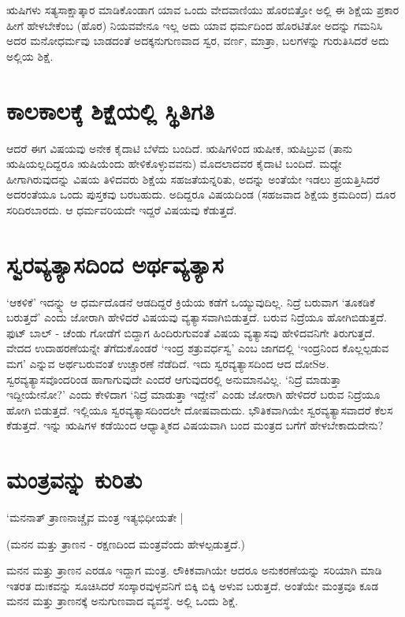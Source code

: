  ಋಷಿಗಳು ಸತ್ಯಸಾಕ್ಷಾತ್ಕಾರ ಮಾಡಿಕೊಂಡಾಗ ಯಾವ ಒಂದು ವೇದವಾಣಿಯು ಹೊರಬಿತ್ತೋ ಅಲ್ಲಿ ಈ ಶಿಕ್ಷೆಯ ಪ್ರಕಾರ ಹೀಗೆ ಹೇಳಬೇಕೆಂಬ (ಹೊರ) ನಿಯವವೇನೂ ಇಲ್ಲ ಅದು ಯಾವ ಧರ್ಮದಿಂದ ಹೊರಟಿತೋ ಅದನ್ನು ಗಮನಿಸಿ ಅದರ ಮನೋಧರ್ಮವು ಬಾಡದಂತೆ ಅದಕ್ಕನುಗುಣವಾದ ಸ್ವರ, ವರ್ಣ, ಮಾತ್ರಾ, ಬಲಗಳನ್ನು  ಗುರುತಿಸಿದರೆ ಅದು ಅಲ್ಲಿಯ ಶಿಕ್ಷೆ.
 
\section*{ಕಾಲಕಾಲಕ್ಕೆ  ಶಿಕ್ಷೆಯಲ್ಲಿ ಸ್ಥಿತಿಗತಿ}

ಆದರೆ ಈಗ ವಿಷಯವು ಅನೇಕ ಕೈದಾಟಿ ಬೆಳೆದು ಬಂದಿದೆ. ಋಷಿಗಳಿಂದ ಋಷೀಕ, ಋಷಿಬ್ರುವ (ತಾನು ಋಷಿಯಲ್ಲದಿದ್ದರೂ ಋಷಿಯೆಂದು ಹೇಳಿಕೊಳ್ಳುವವನು) ಮೊದಲಾದವರ ಕೈದಾಟಿ ಬಂದಿದೆ. ಮಧ್ಯೇ ಹೀಗಾಗಿರುವುದನ್ನು  ವಿಷಯ ತಿಳಿದವರು ಶಿಕ್ಷೆಯ ಸಹಜತೆಯನ್ನರಿತು, ಅದನ್ನು  ಅಂತೆಯೇ ಇಡಲು ಪ್ರಯತ್ತಿಸಿದರೆ ಅದರಂತೆಯೂ ಒಂದು ಪುಸ್ತಕವು ಬರಬಹುದು. ಅದಿದ್ದರೂ  ವಿಷಯದಿಂಡ (ಸಹಜವಾದ ಶಿಕ್ಷೆಯ ಕ್ರಮದಿಂದ) ದೂರ ಸರಿದಿರಬಾರದು. ಆ ಧರ್ಮವರಿಯದೇ ಇದ್ದರೆ ವಿಷಯವು ಕೆಡುತ್ತದೆ.

  
\section*{ಸ್ವರವ್ಯತ್ಯಾಸದಿಂದ  ಅರ್ಥವ್ಯತ್ಯಾಸ}

`ಆಕಳಿಕೆ' ಇದನ್ನ್ನು ಆ ಧರ್ಮದೊಡನೆ ಆಡದಿದ್ದರೆ ಕ್ರಿಯೆಯ ಕಡೆಗೆ ಒಯ್ಯುವುದಿಲ್ಲ. ನಿದ್ರೆ ಬರುವಾಗ `ತೂಕಡಿಕೆ ಬರುತ್ತದೆ' ಎಂದು ಜೋರಾಗಿ ಹೇಳಿದರೆ ವಿಷಯವು ವ್ಯತ್ಯಾಸವಾಗಿಬಿಡುತ್ತದೆ. ಬರುವ ನಿದ್ರೆಯೂ ಹೋಗಿಬಿಡುತ್ತದೆ. ಫುಟ್ ಬಾಲ್ - ಚೆಂಡು ಗೋಡೆಗೆ ಬಿದ್ದಾಗ  ಹಿಂದಿರುಗುವಂತೆ ವಿಷಯ ವ್ಯತ್ಯಾಸವು ಹೇಳಿದವನಿಗೇ ತಿರುಗುತ್ತದೆ. ವೇದದ ಉದಾಹರಣೆಯನ್ನೇ ತೆಗೆದುಕೊಂಡರೆ `ಇಂದ್ರ ಶತ್ರುವರ್ಧಸ್ವ' ಎಂಬ ಜಾಗದಲ್ಲಿ `ಇಂದ್ರನಿಂದ ಕೊಲ್ಲಲ್ಪಡುವ ಮಗ' ಎನ್ನುವ ಅರ್ಥಬರುವಂತೆ ಉಚ್ಚಾರಣೆ ನೆಡೆದಿದೆ. ಇದು ಸ್ವರವ್ಯತ್ಯಾಸದಿಂದ ಆದ ದೋSಅ. ಸ್ವರವ್ಯತ್ಯಾಸವೊಂದರಿಂಡ ಹಾಗಾಗುವುದೇ ಎಂದರೆ ಆಗುವುದರಲ್ಲಿ ಅನುಮಾನವಿಲ್ಲ. `ನಿದ್ರೆ ಮಾಡುತ್ತಾ ಇದ್ದೀಯೇನೋ?' ಎಂದು ಕೇಳಿದಾಗ `ನಿದ್ರೆ ಮಾಡುತ್ತಾ ಇದ್ದೇನೆ' ಎಂಡು ಜೋರಾಗಿ ಹೇಳಿದರೆ ಬರುವ ನಿದ್ರೆಯೂ ಹೋಗಿ ಬಿಡುತ್ತದೆ. ಇಲ್ಲಿಯೂ ಸ್ವರವ್ಯತ್ಯಾಸದಿಂದಲೇ ದೋಷವಾದುದು. ಭೌತಿಕವಾಗಿಯೇ ಸ್ವರವ್ಯತ್ಯಾಸವಾದರೆ ಕೆಲಸ ಕೆಡುತ್ತದೆ. ಇನ್ನು  ಋಷಿಗಳ ಕಡೆಯಿಂದ ಆಧ್ಯಾತ್ಮಿಕದ ವಿಷಯವಾಗಿ ಬಂದ ಮಂತ್ರದ ಬಗೆಗೆ ಹೇಳಬೇಕಾದುದೇನು?

\section*{ಮಂತ್ರವನ್ನು ಕುರಿತು}

\begin{shloka}
	`ಮನನಾತ್ ತ್ರಾಣನಾಚ್ಚೈವ ಮಂತ್ರ ಇತ್ಯಭಿಧೀಯತೇ |
\end{shloka}

(ಮನನ ಮತ್ತು ತ್ರಾಣನ - ರಕ್ಷಣದಿಂದ ಮಂತ್ರವೆಂದು ಹೇಳಲ್ಪಡುತ್ತದೆ.)

ಮನನ ಮತ್ತು ತ್ರಾಣನ ಎರಡೂ ಇದ್ದಾಗ ಮಂತ್ರ. ಲೌಕಿಕವಾಗಿಯೇ ಆದರೂ ಅನುಕರಣೆಯನ್ನು ಸರಿಯಾಗಿ ಮಾಡಿ ಇತರತ ದುಃಕವನ್ನು ಸೂಚಿಸಿದರೆ ಸಂಸ್ಕಾರವುಳ್ಳವನಿಗೆ ಬಿಕ್ಕಿ ಬಿಕ್ಕಿ ಅಳುವ ಬರುತ್ತದೆ. ಅಂತೆಯೇ ಮಂತ್ರವೂ ಕೂಡ ಮನನ ಮತ್ತು ತ್ರಾಣನಕ್ಕೆ ಅನುಗುಣವಾದ ವ್ಯವಸ್ಥೆ. ಅಲ್ಲಿ ಒಂದು ಶಿಕ್ಷೆ.

